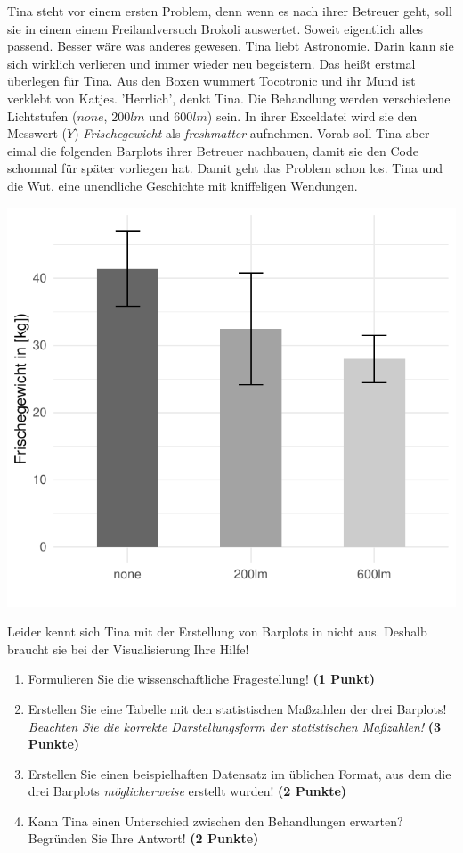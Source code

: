 \documentclass[a4paper, 9pt]{scrartcl}\usepackage[]{graphicx}\usepackage[]{xcolor}
\makeatletter
\def\maxwidth{ %
  \ifdim\Gin@nat@width>\linewidth
    \linewidth
  \else
    \Gin@nat@width
  \fi
}
\makeatother
\begin{document}
Tina steht vor einem ersten Problem, denn wenn es nach ihrer Betreuer geht, soll sie in einem einem Freilandversuch Brokoli auswertet. Soweit eigentlich alles passend. Besser wäre was anderes gewesen. Tina liebt Astronomie. Darin kann sie sich wirklich verlieren und immer wieder neu begeistern. Das heißt erstmal überlegen für Tina. Aus den Boxen wummert Tocotronic und ihr Mund ist verklebt von Katjes. 'Herrlich', denkt Tina. Die Behandlung werden verschiedene Lichtstufen ($none$, $200lm$ und $600lm$) sein. In ihrer Exceldatei wird sie den Messwert ($Y$) \textit{Frischegewicht} als \textit{freshmatter} aufnehmen. Vorab soll Tina aber eimal die folgenden Barplots ihrer Betreuer nachbauen, damit sie den \Rlogo Code schonmal für später vorliegen hat. Damit geht das Problem schon los. Tina und die Wut, eine unendliche Geschichte mit kniffeligen Wendungen.



{\centering \includegraphics[width=\maxwidth]{img/barplot-02-1} 

}




Leider kennt sich Tina mit der Erstellung von Barplots in \Rlogo nicht aus. Deshalb braucht sie bei der Visualisierung Ihre Hilfe!

\begin{enumerate}
\item Formulieren Sie die wissenschaftliche Fragestellung! \textbf{(1 Punkt)}
\item Erstellen Sie eine Tabelle mit den statistischen Maßzahlen der drei Barplots! \textit{Beachten Sie die korrekte Darstellungsform der statistischen Maßzahlen!} \textbf{(3 Punkte)}
\item Erstellen Sie einen beispielhaften Datensatz im \Rlogo üblichen Format, aus dem die drei Barplots \textit{möglicherweise} erstellt wurden! \textbf{(2 Punkte)}
\item Kann Tina einen Unterschied zwischen den Behandlungen erwarten? Begründen Sie Ihre Antwort! \textbf{(2 Punkte)}
\end{enumerate} 
\clearpage
\end{document}
